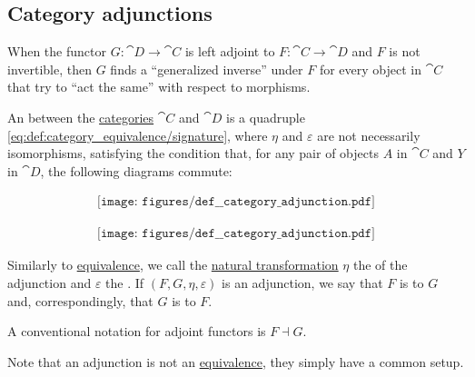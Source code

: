 \subsection{Category adjunctions}\label{subsec:category_adjunctions}

\begin{remark}\label{rem:adjoint_functors}\cite{StanfordPlato:category_theory}
  When the functor \( G: \cat{D} \to \cat{C} \) is left adjoint to \( F: \cat{C} \to \cat{D} \) and \( F \) is not invertible, then \( G \) finds a \enquote{generalized inverse} under \( F \) for every object in \( \cat{C} \) that try to \enquote{act the same} with respect to morphisms.
\end{remark}

\begin{definition}\label{def:category_adjunction}
  An  between the \hyperref[def:category]{categories} \( \cat{C} \) and \( \cat{D} \) is a quadruple \eqref{eq:def:category_equivalence/signature}, where \( \eta \) and \( \varepsilon \) are not necessarily isomorphisms, satisfying the condition that, for any pair of objects \( A \) in \( \cat{C} \) and \( Y \) in \( \cat{D} \), the following diagrams commute:

  \begin{minipage}{0.43\textwidth}
    \begin{equation}\label{eq:def:category_adjunction/diagrams/f}
      \begin{aligned}
        \texttt{[image: figures/def\_\_category\_adjunction.pdf]}
      \end{aligned}
    \end{equation}
  \end{minipage}
  \hfill
  \begin{minipage}{0.44\textwidth}
    \raggedright
    \begin{equation}\label{eq:def:category_adjunction/diagrams/g}
      \begin{aligned}
        \texttt{[image: figures/def\_\_category\_adjunction.pdf]}
      \end{aligned}
    \end{equation}
  \end{minipage}
  \smallskip

  Similarly to \hyperref[def:category_equivalence]{equivalence}, we call the \hyperref[def:natural_transformation]{natural transformation} \( \eta \) the  of the adjunction and \( \varepsilon \) the . If \( (F, G, \eta, \varepsilon) \) is an adjunction, we say that \( F \) is  to \( G \) and, correspondingly, that \( G \) is  to \( F \).

  A conventional notation for adjoint functors is \( F \dashv G \).

  Note that an adjunction is not an \hyperref[def:category_equivalence]{equivalence}, they simply have a common setup.
\end{definition}
